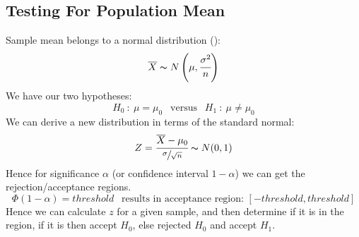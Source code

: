 \documentclass{report}
\begin{document}
        \subsection*{Testing For Population Mean}
            Sample mean belongs to a normal distribution ():
            \[\overline{X} \thicksim N\left( \mu, \cfrac{\sigma^2}{n}\right)\]
            We have our two hypotheses:
            \[H_0 \ : \ \mu = \mu_0 \ \ \text{  versus  } \ \ H_1 \ : \ \mu \neq \mu_0\]
            We can derive a new distribution in terms of the standard normal:
            \[Z = \cfrac{\overline{X} - \mu_0}{\sfrac{\sigma}{\sqrt{n}}} \thicksim N(0,1)\]
            Hence for significance $\alpha$ (or confidence interval $1 - \alpha$) we can get the rejection/acceptance regions.
            \[\Phi(1 - \alpha) = threshold \ \ \text{   results in acceptance region: } [-threshold, threshold] \]
            Hence we can calculate $z$ for a given sample, and then determine if it is in the region, if it is then accept $H_0$, else rejected $H_0$ and accept $H_1$.
\end{document}
